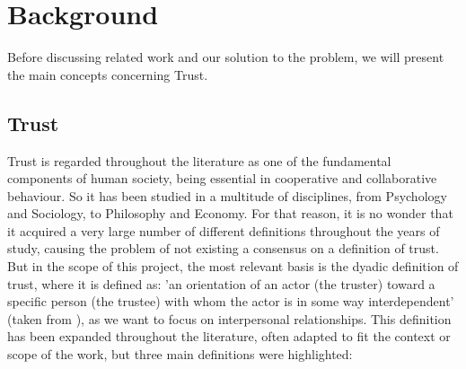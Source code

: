 \section{Background}
\label{sec:Background}



Before discussing related work and our solution to the problem, we will present the main concepts concerning Trust.

\subsection{Trust}
\label{subsec:Trust}
Trust is regarded throughout the literature as one of the fundamental components of human society, being essential in cooperative and collaborative behaviour. So it has been studied in a multitude of disciplines, from Psychology and Sociology, to Philosophy and Economy\cite{Rousseau1998, Jones1997, Sabater2005}. For that reason, it is no wonder that it acquired a very large number of different definitions throughout the years of study, causing the problem of not existing a consensus on a definition of trust\cite{Castelfranchi2010}. But in the scope of this project, the most relevant basis is the dyadic definition of trust, where it is defined as: 'an orientation of an actor (the truster) toward a specific person (the trustee) with whom the actor is in some way interdependent' (taken from \cite{Simpson2007}), as we want to focus on interpersonal relationships. This definition has been expanded throughout the literature, often adapted to fit the context or scope of the work, but three main definitions were highlighted:
